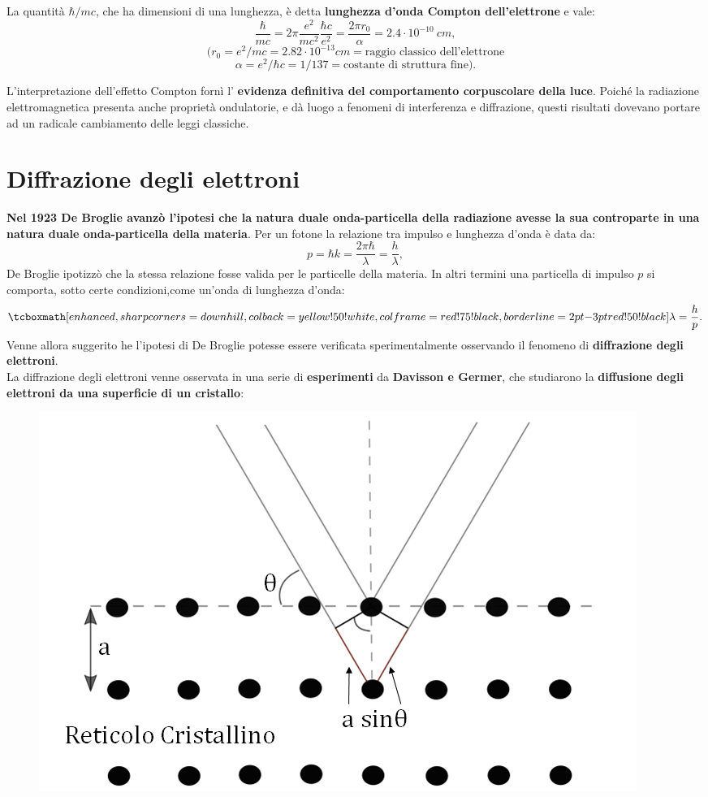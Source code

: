 La quantità $\hbar/ mc$, che ha dimensioni di una lunghezza, è detta \textbf{lunghezza d'onda Compton dell'elettrone} e vale:
\[
\frac{\hbar}{mc}= 2\pi \frac{e^2}{mc^2}\frac{\hbar c}{e^2}= \frac{2\pi r_0}{\alpha}= 2.4 \cdot 10^{-10} \ cm,
\]
\[(r_0 = e^2/mc = 2.82 \cdot 10^{-13} cm = \textrm{raggio classico dell'elettrone}\]
\[\alpha = e^2/\hbar c = 1/137 = \textrm{costante di struttura fine}).\]

L'interpretazione dell'effetto Compton fornì l' \textbf{evidenza definitiva del comportamento corpuscolare della luce}. Poiché la radiazione elettromagnetica presenta anche proprietà ondulatorie, e dà luogo a fenomeni di interferenza e diffrazione, questi risultati dovevano portare ad un radicale cambiamento delle leggi classiche.
\section{Diffrazione degli elettroni}
\textbf{Nel 1923 De Broglie avanzò l'ipotesi che la natura duale onda-particella della radiazione avesse la sua controparte in una natura duale onda-particella della materia}. Per un fotone la relazione tra impulso e lunghezza d'onda è data da:
\begin{equation}
p= \hbar k = \frac{2\pi \hbar}{\lambda}=\frac{h}{\lambda},
\end{equation}
De Broglie ipotizzò che la stessa relazione fosse valida per le particelle della materia. In altri termini una particella di impulso $p$ si comporta, sotto certe condizioni,come un'onda di lunghezza d'onda:
	\begin{equation}
		\tcboxmath[enhanced,sharp corners=downhill ,colback=yellow!50!white,colframe=red!75!black, borderline={2pt}{-3pt}{red!50!black}]{
			\lambda=\frac{h}{p}.
			}
	\end{equation}
Venne allora suggerito he l'ipotesi di De Broglie potesse essere verificata sperimentalmente osservando il fenomeno di \textbf{diffrazione degli elettroni}.\\
La diffrazione degli elettroni venne osservata in una serie di \textbf{esperimenti} da \textbf{Davisson e Germer}, che studiarono la \textbf{diffusione degli elettroni da una superficie di un cristallo}:
	\begin{figure}[!htbp]
		\begin{center}
			\includegraphics[width=.55\textwidth]{immagini/cap_1/fig_1_5.png}
		\end{center}
	\end{figure}
